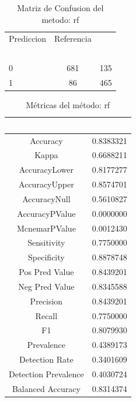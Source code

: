 \begin{table}[!h]
	
	\caption{\label{tab:MatrizConf_rf}Matriz de Confusion del metodo: rf }
	\centering
	\begin{tabular}[t]{lcc}
		\toprule
		\multicolumn{1}{c}{Prediccion} & \multicolumn{1}{c}{Referencia} & \multicolumn{1}{c}{ } \\
		\cmidrule(l{3pt}r{3pt}){1-1} \cmidrule(l{3pt}r{3pt}){2-2}
		\rowcolor{black}  \multicolumn{1}{c}{\textcolor{white}{\textbf{ }}} & \multicolumn{1}{c}{\textcolor{white}{\textbf{0}}} & \multicolumn{1}{c}{\textcolor{white}{\textbf{1}}}\\
		\midrule
		\rowcolor{gray!6}  0 & 681 & 135\\
		1 & 86 & 465\\
		\bottomrule
	\end{tabular}
\end{table}

\begin{table}[!h]
	
	\caption{\label{tab:metricas_rf}Métricas del método: rf }
	\centering
	\begin{tabular}[t]{cc}
		\toprule
		\rowcolor{black}  \multicolumn{1}{c}{\textcolor{white}{\textbf{metricas}}} & \multicolumn{1}{c}{\textcolor{white}{\textbf{valor}}}\\
		\midrule
		\rowcolor{gray!6}  Accuracy & 0.8383321\\
		Kappa & 0.6688211\\
		\rowcolor{gray!6}  AccuracyLower & 0.8177277\\
		AccuracyUpper & 0.8574701\\
		\rowcolor{gray!6}  AccuracyNull & 0.5610827\\
		\addlinespace
		AccuracyPValue & 0.0000000\\
		\rowcolor{gray!6}  McnemarPValue & 0.0012430\\
		Sensitivity & 0.7750000\\
		\rowcolor{gray!6}  Specificity & 0.8878748\\
		Pos Pred Value & 0.8439201\\
		\addlinespace
		\rowcolor{gray!6}  Neg Pred Value & 0.8345588\\
		Precision & 0.8439201\\
		\rowcolor{gray!6}  Recall & 0.7750000\\
		F1 & 0.8079930\\
		\rowcolor{gray!6}  Prevalence & 0.4389173\\
		\addlinespace
		Detection Rate & 0.3401609\\
		\rowcolor{gray!6}  Detection Prevalence & 0.4030724\\
		Balanced Accuracy & 0.8314374\\
		\bottomrule
	\end{tabular}
\end{table}


